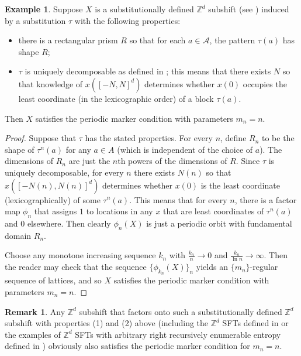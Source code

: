 \documentclass[12pt]{amsart}
\theoremstyle{definition}
\newtheorem{example}[theorem]{Example}
\newtheorem{remark}[theorem]{Remark}
\begin{document}
\begin{example}
Suppose $X$ is a substitutionally defined $\mathbb{Z}^d$ subshift (see \cite{frank}) induced by a substitution $\tau$ with the following properties:

\begin{itemize}
\item[(1)] there is a rectangular prism $R$ so that for each $a \in \mathcal{A}$, the pattern $\tau(a)$ has shape $R$;


\item[(2)] $\tau$ is uniquely decomposable as defined in \cite{solomyak}; this means that there exists $N$ so that knowledge of $x([-N,N]^d)$ determines whether $x(0)$ occupies the least coordinate (in the lexicographic order) of a block $\tau(a)$. %
\end{itemize}
Then $X$ satisfies the periodic marker condition with parameters $m_n = n$. 
\end{example}
\begin{proof}
Suppose that $\tau$ has the stated properties. For every $n$, define $R_n$ to be the shape of $\tau^n(a)$ for any $a \in A$ (which is independent of the choice of $a$). The dimensions of $R_n$ are just the $n$th powers of the dimensions of $R$. Since $\tau$ is uniquely decomposable, for every $n$ there exists $N(n)$ so that $x([-N(n),N(n)]^d)$ determines whether $x(0)$ is the least coordinate 
(lexicographically) of some $\tau^n(a)$. This means that for every $n$, there is a factor map $\phi_n$ that assigns $1$ to locations in any $x$ that are least coordinates of $\tau^n(a)$ and $0$ elsewhere. Then clearly $\phi_n(X)$ is just a periodic orbit with fundamental domain $R_n$. 

Choose any monotone increasing sequence $k_n$ with $\frac{k_n}{n} \rightarrow 0$ and $\frac{k_n}{\ln n} \rightarrow \infty$. Then the reader may check that the sequence $\{\phi_{k_n}(X)\}_n$ yields an $\{m_n\}$-regular sequence of lattices, and so $X$ satisfies the periodic marker condition with parameters $m_n = n$.
\end{proof}

\begin{remark} 
Any $\mathbb{Z}^d$ subshift that factors onto such a substitutionally defined $\mathbb{Z}^d$ subshift with properties (1) and (2) above (including the $\mathbb{Z}^d$ SFTs defined in \cite{mozes} or the examples of $\mathbb{Z}^d$ SFTs with arbitrary right recursively enumerable entropy defined in \cite{HM}) obviously also satisfies the periodic marker condition for $m_n = n$.
\end{remark}
\end{document}
